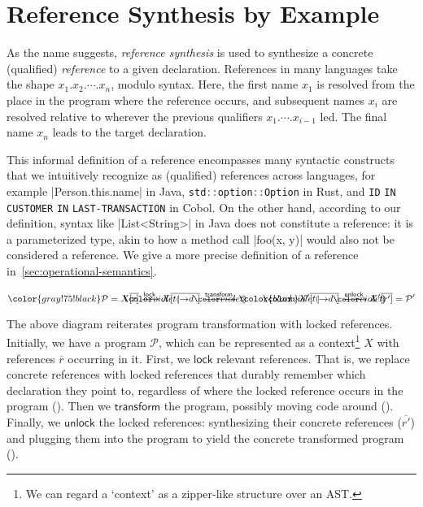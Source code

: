 \section{Reference Synthesis by Example}%
\label{sec:reference-synthesis-by-example}

As the name suggests, \emph{reference synthesis} is used to synthesize a concrete (qualified) \emph{reference} to a given declaration.
References in many languages take the shape $x_1.x_2. \cdots .x_n$, modulo syntax.
Here, the first name $x_1$ is resolved from the place in the program where the reference occurs, and subsequent names $x_i$ are resolved relative to wherever the previous qualifiers $x_1. \cdots .x_{i-1}$ led.
The final name $x_n$ leads to the target declaration.

This informal definition of a reference encompasses many syntactic constructs that we intuitively recognize as (qualified) references across languages, for example \Java|Person.this.name| in Java, \lstinline[language=C]|std::option::Option| in Rust, and \lstinline[language=Cobol]|ID| \lstinline[language=Cobol]|IN| \lstinline[language=Cobol]|CUSTOMER| \lstinline[language=Cobol]|IN| \lstinline[language=Cobol]|LAST-TRANSACTION| in Cobol. %
On the other hand, according to our definition, syntax like \Java|List<String>| in Java does not constitute a reference: it is a parameterized type, akin to how a method call \Java|foo(x, y)| would also not be considered a reference.
We give a more precise definition of a reference in~\cref{sec:operational-semantics}.

\[
  \color{gray!75!black}
  \mathcal{P} =
  X\overline{[r]} \xrightarrow{\textsf{lock}}
  X\overline{[\rhole[5]{d}]} \xrightarrow{\textsf{transform}}
  {\color{black}
  X'\overline{[\rhole[5]{d}]} \xrightarrow{\textsf{unlock}}                 
  X'\overline{[r']}
  }
  = \mathcal{P}'
\]%

\noindent
The above diagram reiterates program transformation with locked references.
Initially, we have a program $\mathcal{P}$, which can be represented as a context\footnote{We can regard a `context' as a zipper-like structure over an AST.} $X$ with references $\overline{r}$ occurring in it.
First, we $\mathsf{lock}$ relevant references.
That is, we replace concrete references with locked references that durably remember which declaration they point to, regardless of where the locked reference occurs in the program ().
Then we $\mathsf{transform}$ the program, possibly moving code around ().
Finally, we $\mathsf{unlock}$ the locked references: synthesizing their concrete references ($\overline{r'}$) and plugging them into the program to yield the concrete transformed program ().

